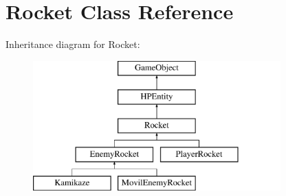 \hypertarget{class_rocket}{\section{Rocket Class Reference}
\label{class_rocket}
}
Inheritance diagram for Rocket\-:\begin{figure}[H]
\begin{center}
\leavevmode
\includegraphics[height=5.000000cm]{class_rocket}
\end{center}
\end{figure}
